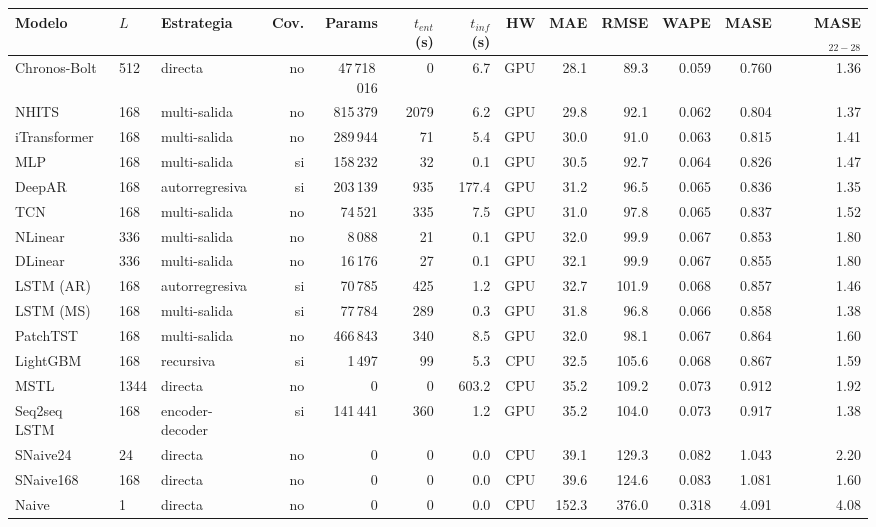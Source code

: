 \begin{tabular}{@{}lllrrrrrrrrrr@{}}
\toprule
Modelo & $L$ & Estrategia & Cov. & Params & $t_{ent}$ (s) & $t_{inf}$ (s) & HW & MAE & RMSE & WAPE & MASE & MASE$_{22-28}$ \\ \midrule
Chronos-Bolt & 512 & directa & no & 47\,718\,016 & 0 & 6.7 & GPU & 28.1 & 89.3 & 0.059 & 0.760 & 1.36 \\
NHITS & 168 & multi-salida & no & 815\,379 & 2079 & 6.2 & GPU & 29.8 & 92.1 & 0.062 & 0.804 & 1.37 \\
iTransformer & 168 & multi-salida & no & 289\,944 & 71 & 5.4 & GPU & 30.0 & 91.0 & 0.063 & 0.815 & 1.41 \\
MLP & 168 & multi-salida & si & 158\,232 & 32 & 0.1 & GPU & 30.5 & 92.7 & 0.064 & 0.826 & 1.47 \\
DeepAR & 168 & autorregresiva & si & 203\,139 & 935 & 177.4 & GPU & 31.2 & 96.5 & 0.065 & 0.836 & 1.35 \\
TCN & 168 & multi-salida & no & 74\,521 & 335 & 7.5 & GPU & 31.0 & 97.8 & 0.065 & 0.837 & 1.52 \\
NLinear & 336 & multi-salida & no & 8\,088 & 21 & 0.1 & GPU & 32.0 & 99.9 & 0.067 & 0.853 & 1.80 \\
DLinear & 336 & multi-salida & no & 16\,176 & 27 & 0.1 & GPU & 32.1 & 99.9 & 0.067 & 0.855 & 1.80 \\
LSTM (AR) & 168 & autorregresiva & si & 70\,785 & 425 & 1.2 & GPU & 32.7 & 101.9 & 0.068 & 0.857 & 1.46 \\
LSTM (MS) & 168 & multi-salida & si & 77\,784 & 289 & 0.3 & GPU & 31.8 & 96.8 & 0.066 & 0.858 & 1.38 \\
PatchTST & 168 & multi-salida & no & 466\,843 & 340 & 8.5 & GPU & 32.0 & 98.1 & 0.067 & 0.864 & 1.60 \\
LightGBM & 168 & recursiva & si & 1\,497 & 99 & 5.3 & CPU & 32.5 & 105.6 & 0.068 & 0.867 & 1.59 \\
MSTL & 1344 & directa & no & 0 & 0 & 603.2 & CPU & 35.2 & 109.2 & 0.073 & 0.912 & 1.92 \\
Seq2seq LSTM & 168 & encoder-decoder & si & 141\,441 & 360 & 1.2 & GPU & 35.2 & 104.0 & 0.073 & 0.917 & 1.38 \\
SNaive24 & 24 & directa & no & 0 & 0 & 0.0 & CPU & 39.1 & 129.3 & 0.082 & 1.043 & 2.20 \\
SNaive168 & 168 & directa & no & 0 & 0 & 0.0 & CPU & 39.6 & 124.6 & 0.083 & 1.081 & 1.60 \\
Naive & 1 & directa & no & 0 & 0 & 0.0 & CPU & 152.3 & 376.0 & 0.318 & 4.091 & 4.08 \\
\bottomrule
\end{tabular}